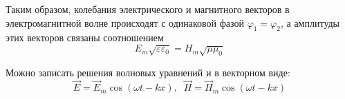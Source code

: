 \documentclass{article}
\begin{document}
	Таким образом, колебания электрического и магнитного векторов в электромагнитной волне происходят с одинаковой фазой $\varphi_1=\varphi_2$, а амплитуды этих векторов связаны соотношением
	\begin{equation}
		E_m\sqrt{\varepsilon\varepsilon_0}=H_m\sqrt{\mu\mu_0}
	\end{equation}

	Можно записать решения волновых уравнений и в векторном виде:
	\begin{equation}
		\vec E = \vec E_m\cos(\omega t - kx),\;\;\vec H = \vec H_m\cos(\omega t - kx)
	\end{equation}
\end{document}
